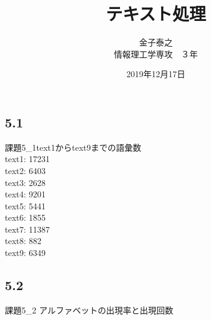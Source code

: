 \documentclass[a4j,titlepage]{jarticle}
\title{テキスト処理}
\author{金子泰之\\情報理工学専攻　３年}
\date{2019年12月17日}
\begin{document}
\maketitle



\subsection*{5.1}
  課題5\_1text1からtext9までの語彙数\\
  text1: 17231\\
  text2: 6403\\
  text3: 2628\\
  text4: 9201\\
  text5: 5441\\
  text6: 1855\\
  text7: 11387\\
  text8: 882\\
  text9: 6349
\subsection*{5.2}
  課題5\_2 アルファベットの出現率と出現回数\\
\end{document}
